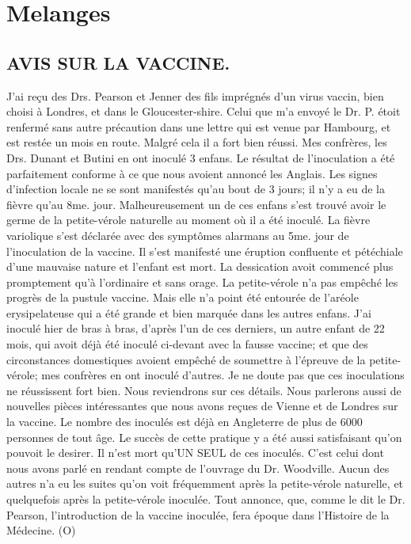 \setcounter{page}{199}
\chapter{Melanges}
\section{AVIS SUR LA VACCINE.}
J'ai reçu des Drs. Pearson et Jenner des fils imprégnés d'un virus vaccin, bien choisi à Londres, et dans le Gloucester-shire. Celui que m'a envoyé le Dr. P. étoit renfermé sans autre précaution dans une lettre qui est venue par Hambourg, et est restée un mois en route. Malgré cela il a fort bien réussi. Mes confrères, les Drs. Dunant et Butini en ont inoculé 3 enfans. Le résultat de l'inoculation a été parfaitement conforme à ce que nous avoient annoncé les Anglais. Les signes d'infection locale ne se sont manifestés qu'au bout de 3 jours; il n'y a eu de la fièvre qu'au 8me. jour. Malheureusement un de ces enfans s'est trouvé avoir le germe de la petite-vérole naturelle au moment où il a été inoculé. La fièvre variolique s'est déclarée avec des symptômes alarmans au 5me. jour de l'inoculation de la vaccine. Il s'est manifesté une éruption confluente et pétéchiale d'une mauvaise nature et l'enfant est mort. La dessication avoit commencé plus promptement qu'à l'ordinaire et sans orage. La petite-vérole n'a pas empêché les progrès de la pustule vaccine. Mais elle n'a point été entourée de l'aréole erysipelateuse qui a été grande et bien marquée dans les autres enfans.
\setcounter{page}{200}
J'ai inoculé hier de bras à bras, d'après l'un de ces derniers, un autre enfant de 22 mois, qui avoit déjà été inoculé ci-devant avec la fausse vaccine; et que des circonstances domestiques avoient empêché de soumettre à l'épreuve de la petite-vérole; mes confrères en ont inoculé d'autres. Je ne doute pas que ces inoculations ne réussissent fort bien.
Nous reviendrons sur ces détails. Nous parlerons aussi de nouvelles pièces intéressantes que nous avons reçues de Vienne et de Londres sur la vaccine. Le nombre des inoculés est déjà en Angleterre de plus de 6000 personnes de tout âge. Le succès de cette pratique y a été aussi satisfaisant qu'on pouvoit le desirer. Il n'est mort qu'UN SEUL de ces inoculés. C'est celui dont nous avons parlé en rendant compte de l'ouvrage du Dr. Woodville.
Aucun des autres n'a eu les suites qu'on voit fréquemment après la petite-vérole naturelle, et quelquefois après la petite-vérole inoculée. Tout annonce, que, comme le dit le Dr. Pearson, l'introduction de la vaccine inoculée, fera époque dans l'Histoire de la Médecine. (O)